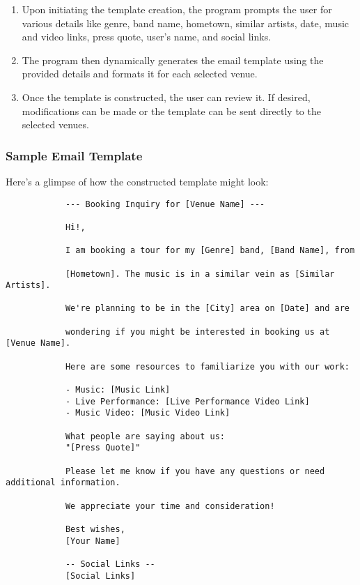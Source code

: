 \documentclass{article}
\begin{document}
	\begin{enumerate}
		\item Upon initiating the template creation, the program prompts the user for various details like genre, band name, hometown, similar artists, date, music and video links, press quote, user's name, and social links.
		\item The program then dynamically generates the email template using the provided details and formats it for each selected venue.
		\item Once the template is constructed, the user can review it. If desired, modifications can be made or the template can be sent directly to the selected venues.
	\end{enumerate}

\newpage
	\subsubsection*{Sample Email Template}
	Here's a glimpse of how the constructed template might look:

	\begin{mdframed}[backgroundcolor=background, hidealllines=false, innerleftmargin=15pt, innerrightmargin=5pt, innertopmargin=0pt, innerbottommargin=-5pt, linecolor=accent]
		\begin{lstlisting}
			--- Booking Inquiry for [Venue Name] ---
			
			Hi!,
			
			I am booking a tour for my [Genre] band, [Band Name], from 
			
			[Hometown]. The music is in a similar vein as [Similar Artists].
			
			We're planning to be in the [City] area on [Date] and are
			
			wondering if you might be interested in booking us at [Venue Name].
			
			Here are some resources to familiarize you with our work:
			
			- Music: [Music Link]
			- Live Performance: [Live Performance Video Link]
			- Music Video: [Music Video Link]
			
			What people are saying about us:
			"[Press Quote]"
			
			Please let me know if you have any questions or need additional information.
			
			We appreciate your time and consideration!
			
			Best wishes,
			[Your Name]
			
			-- Social Links --
			[Social Links]
		\end{lstlisting}
	\end{mdframed}
		
\end{document}
